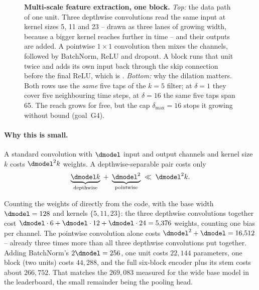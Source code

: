 \ifshowblockfig
\begin{figure}[t]
  \centering
  
  \caption{\textbf{Multi-scale feature extraction, one block.} \emph{Top:} the data path of one
  unit. Three depthwise convolutions read the same input at kernel sizes 5, 11 and 23 -- drawn as
  three lanes of growing width, because a bigger kernel reaches further in time -- and their outputs
  are added. A pointwise $1\times1$ convolution then mixes the channels, followed by BatchNorm, ReLU
  and dropout. A block runs that unit twice and adds its own input back through the skip connection
  before the final ReLU, which is . \emph{Bottom:} why the dilation matters. Both
  rows use the \emph{same} five taps of the $k=5$ filter; at $\delta=1$ they cover five neighbouring
  time steps, at $\delta=16$ the same five taps span 65. The reach grows for free, but the cap
  $\delta_{\max} = 16$ stops it growing without bound (goal~G4).}
  \label{fig:arch_block}
\end{figure}
\fi

\paragraph{Why this is small.}
A standard convolution with $\dmodel$ input and output channels and kernel size $k$ costs
$\dmodel^2 k$ weights. A depthwise-separable pair costs only
\begin{equation}
  \underbrace{\dmodel k}_{\text{depthwise}} \;+\; \underbrace{\dmodel^2}_{\text{pointwise}}
  \;\ll\; \dmodel^2 k .
  \label{eq:sep_cost}
\end{equation}

Counting the weights of  directly from the code, with the base width $\dmodel = 128$
and kernels $\{5,11,23\}$: the three depthwise convolutions together cost
$\dmodel \cdot 6 + \dmodel \cdot 12 + \dmodel \cdot 24 = 5{,}376$ weights, counting one bias per
channel. The pointwise convolution alone costs $\dmodel^2 + \dmodel = 16{,}512$ -- already three
times more than all three depthwise convolutions put together. Adding BatchNorm's $2\dmodel = 256$,
one unit costs $22{,}144$ parameters, one block (two units) costs $44{,}288$, and the full six-block
encoder plus its stem costs about $266{,}752$. That matches the $269{,}083$ measured for the wide
base model in the leaderboard, the small remainder being the pooling head.

